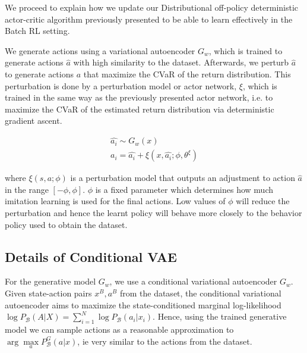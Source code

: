 We proceed to explain how we update our Distributional off-policy deterministic actor-critic algorithm previously
presented to be able to learn effectively in the Batch RL setting.

We generate actions using a  variational autoencoder $G_w$,
which is trained to generate actions $\hat{a}$ with high  similarity  to  the  dataset.  
Afterwards, we perturb $\hat{a}$  to generate actions $a$ that maximize the CVaR of the return
distribution. This perturbation is done by a perturbation model  or actor network, $\xi$, which is trained in
the same way as the previously presented actor network,
i.e. to maximize the CVaR of the estimated return distribution via deterministic gradient ascent.

\begin{align}
    \hat{a_i} \sim G_w(x)\\
    a_i =  \hat{a_i} + \xi(x,\hat{a_i};\phi,\theta^\xi)
\end{align}

where  $\xi(s,a;\phi)$ is a perturbation model that outputs an adjustment to action $\hat{a}$
in the range $[-\phi,\phi]$. $\phi$ is a fixed parameter which determines how much imitation learning
is used for the final actions. Low values of $\phi$ will reduce the perturbation and hence the 
learnt policy will behave more closely to the behavior policy used to obtain the dataset.



\subsection{Details of Conditional VAE}
For the generative model $G_w$, we use a conditional variational autoencoder $G_w$.
Given state-action pairs $x^B,a^B$ from the dataset, the conditional variational autoencoder
aims to maximize the state-conditioned marginal log-likelihood  
$\log P_\mathcal{B}(A|X) = \sum_{i=1}^{N}\log  P_\mathcal{B}(a_i|x_i)$.
Hence, using the trained generative model we can sample actions
as a reasonable approximation to $ \arg \underset{a}\max P_\mathcal{B}^G(a|x)$, ie very similar to 
the actions from the dataset.

